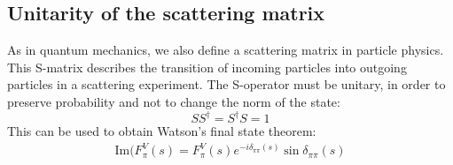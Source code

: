 \documentclass[a4paper]{article}
\begin{document}
\subsection{Unitarity of the scattering matrix}
As in quantum mechanics, we also define a scattering matrix in particle
physics. This S-matrix describes the transition of incoming particles into
outgoing particles in a scattering experiment. The S-operator must be unitary,
in order to preserve probability and not to change the norm of the state:
\begin{equation}
    SS^\dagger=S^\dagger S=1
\end{equation}
This can be used to obtain Watson's final state theorem:
\begin{align}
    \label{eq:rec}
    \text{Im}(F^V_\pi(s) = F^V_\pi(s) e^{-i\delta_{\pi\pi}(s)}\sin\delta_{\pi\pi}(s)
\end{align}
\end{document}
